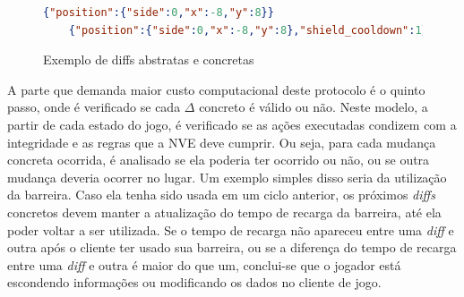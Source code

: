 \begin{figure}
  \begin{lstlisting}[language=json,firstnumber=1]
    {"position":{"side":0,"x":-8,"y":8}}
    {"position":{"side":0,"x":-8,"y":8},"shield_cooldown":1}
  \end{lstlisting}
  \caption{Exemplo de diffs abstratas e concretas}
  \label{fig:exa}
\end{figure}


A parte que demanda maior custo computacional deste protocolo é o quinto passo, onde é verificado se cada $\Delta$ concreto é válido ou não. Neste modelo, a partir de cada estado do jogo, é verificado se as ações executadas condizem com a integridade e as regras que a NVE deve cumprir. Ou seja, para cada mudança concreta ocorrida, é analisado se ela poderia ter ocorrido ou não, ou se outra mudança deveria ocorrer no lugar. Um exemplo simples disso seria da utilização da barreira. Caso ela tenha sido usada em um ciclo anterior, os próximos \textit{diffs} concretos devem manter a atualização do tempo de recarga da barreira, até ela poder voltar a ser utilizada. Se o tempo de recarga não apareceu entre uma \textit{diff} e outra após o cliente ter usado sua barreira, ou se a diferença do tempo de recarga entre uma \textit{diff} e outra é maior do que um, conclui-se que o jogador está escondendo informações ou modificando os dados no cliente de jogo.